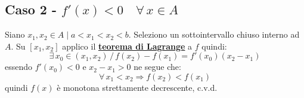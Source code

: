 \documentclass[../dimostrazioni]{subfiles}
\begin{document}
            \subsection*{Caso 2 - \( f'(x) < 0 \quad \forall \, x \in A \)}

            Siano \(x_1, x_2 \in A \mid a < x_1 < x_2 < b \). Seleziono un sottointervallo chiuso interno ad \(A\).
            Su \( [x_1, x_2] \) applico il \textbf{\hyperref[teoLagrange]{teorema di Lagrange}} a \(f\) quindi:
            \[
                \exists \, x_0 \in (x_1, x_2) \, / \, f(x_2) - f(x_1) = f'(x_0)(x_2 - x_1) 
            \]
            essendo \( f'(x_0) < 0 \) e \( x_2 - x_1 > 0 \) ne segue che:
            \[
                \forall \, x_1 < x_2 \Rightarrow f(x_2) < f(x_1)
            \]
            quindi \(f(x)\) è monotona strettamente decrescente, c.v.d.
    
    
\end{document}
